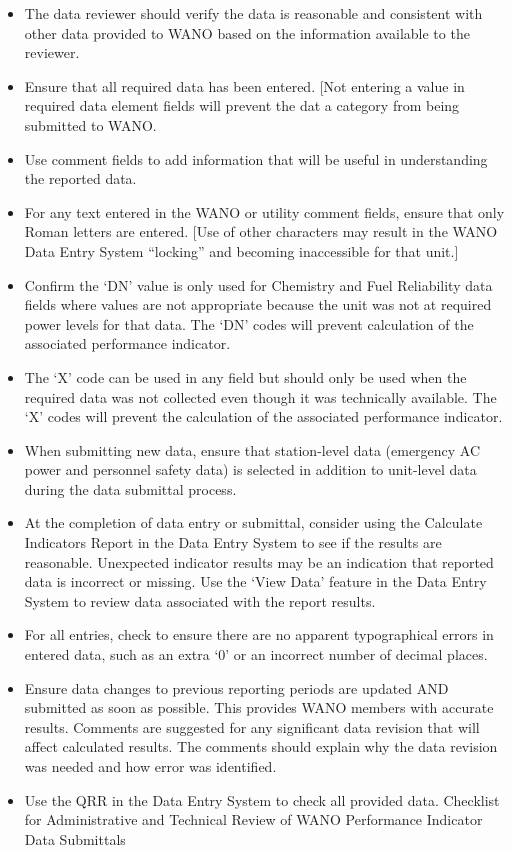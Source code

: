 \begin{itemize}
\item The data reviewer should verify the
data is reasonable and consistent with
other data provided to
WANO based on the information available to the
reviewer.
\item Ensure that all required data has
been entered. [Not entering a value in
required data element fields will prevent the dat
a category from being
submitted to WANO.
\item Use comment fields to add information that will be useful in understanding
the reported data.
\item For any text entered in the WANO or utility comment fields, ensure that
only Roman letters are entered. [Use of other characters may result in the
WANO Data Entry System “locking” and becoming inaccessible for that
unit.]
\item Confirm the ‘DN’ value is only
 used for Chemistry and Fuel Reliability data
fields where values are not appropriate because the unit was not at
required power levels for that data.
The ‘DN’ codes will prevent calculation
of the associated performance indicator.
\item The ‘X’ code can be used in any field but should only be used when the
required data was not collected even though it was technically available.
The ‘X’ codes will prevent the calculation of the associated performance
indicator.
\item When submitting new data, ensure that
 station-level data (emergency AC power and personnel safety data) is
 selected in addition to unit-level data during the data submittal process.
\item At the completion of data entry or submittal, consider using the Calculate
Indicators Report in the Data Entry System to see if the results are
reasonable. Unexpected indicator results may be an indication that
reported data is incorrect or missing.
Use the ‘View Data’ feature in the Data Entry System to review data
associated with the report results.
\item For all entries, check to ensure there are no apparent typographical errors
in entered data, such as an extra ‘0’ or an incorrect number of decimal
places.
\item Ensure data changes to previous reporting periods are updated AND
submitted as soon as possible. This provides WANO members with
accurate results. Comments are suggested for any significant data
revision that will affect calculated results. The comments should explain
why the data revision was needed and how error was identified.
\item Use the QRR in the Data Entry System to check all provided data.
Checklist for Administrative and Technical Review of WANO Performance Indicator Data Submittals
\end{itemize}

